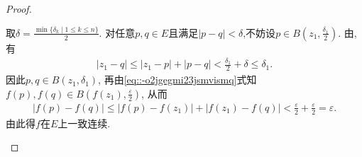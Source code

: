 \documentclass[../../main.tex]{subfiles}%
\begin{document}
\begin{proof}
\begin{enumerate}[(1)]
取$\delta=\frac{\min \{\delta _k\mid 1\leqslant k\leqslant n\}}{2}$. 对任意$p,q\in E$且满足$|p-q|<\delta$,不妨设$p\in B(z_1,\frac{\delta_1}{2})$. 由, 有
\begin{align*}
|z_1-q|\leqslant |z_1-p|+|p-q|<\frac{\delta_1}{2}+\delta\leqslant \delta_1.
\end{align*}
因此$p,q\in B(z_1,\delta_1)$, 再由\eqref{eq::-o2jgegmi23jsmvismq}式知$f(p),f(q)\in B(f(z_1),\frac{\varepsilon}{2})$, 从而
\begin{align*}
|f(p)-f(q)|\leqslant |f(p)-f(z_1)|+|f(z_1)-f(q)|<\frac{\varepsilon}{2}+\frac{\varepsilon}{2}=\varepsilon.
\end{align*}
由此得$f$在$E$上一致连续.
\end{enumerate}

\end{proof}
\end{document}
